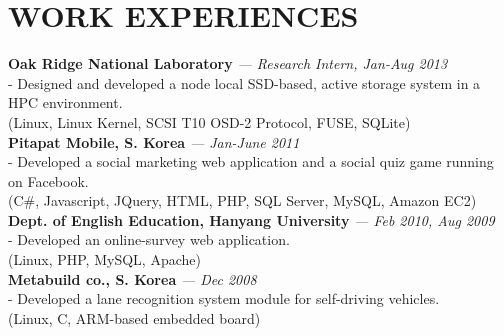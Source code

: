 \section{WORK EXPERIENCES} 
\vspace{0.07in} 
{\bf Oak Ridge National Laboratory}
{\it \footnotesize --- Research Intern, Jan-Aug 2013}\\
  - Designed and developed a node local SSD-based, active storage system in a HPC
  environment.\\
  {\footnotesize(Linux, Linux Kernel, SCSI T10 OSD-2 Protocol, FUSE, SQLite)}
\vspace{0.03in}\\
{\bf Pitapat Mobile, S. Korea}
{\it \footnotesize --- Jan-June 2011}\\
  - Developed a social marketing web application and a social quiz game running on
  Facebook.\\
  {\footnotesize(C\#, Javascript, JQuery, HTML, PHP, SQL Server, MySQL, Amazon
  EC2)}
\vspace{0.03in}\\
{\bf Dept. of English Education, Hanyang University}
{\it \footnotesize --- Feb 2010, Aug 2009}\\
  - Developed an online-survey web application.\\
  {\footnotesize(Linux, PHP, MySQL, Apache)}
\vspace{0.03in}\\
{\bf Metabuild co., S. Korea}
{\it \footnotesize --- Dec 2008}\\
  - Developed a lane recognition system module for self-driving vehicles.\\
  {\footnotesize(Linux, C, ARM-based embedded board)}


